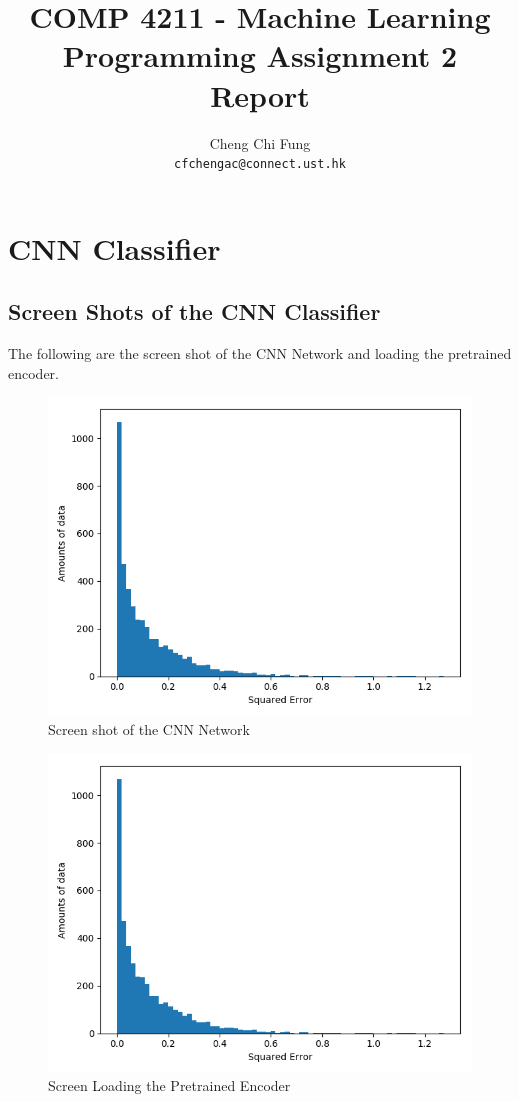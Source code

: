 \documentclass{article}
\title{COMP 4211 - Machine Learning Programming Assignment 2 Report}
\author{%
	Cheng Chi Fung \\
	\texttt{cfchengac@connect.ust.hk} \\
}
\begin{document}
\maketitle

\section{CNN Classifier}

\subsection{Screen Shots of the CNN Classifier}
The following are the screen shot of the CNN Network and loading the pretrained encoder.

\begin{figure}[h]
  \centering
  \includegraphics[scale=0.3]{fifa_lg.png}
  \caption{Screen shot of the CNN Network}
\end{figure}

\begin{figure}[h]
  \centering
  \includegraphics[scale=0.3]{fifa_lg.png}
  \caption{Screen Loading the Pretrained Encoder}
\end{figure}
\end{document}
